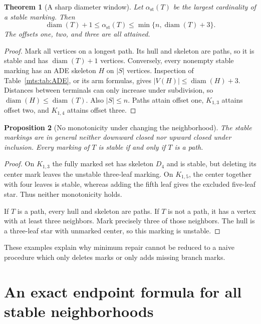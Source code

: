 \documentclass[11pt]{article}
\numberwithin{equation}{section}
\newtheorem{theorem}{Theorem}[section]
\newtheorem{proposition}[theorem]{Proposition}
\theoremstyle{definition}
\newcommand{\diam}{\operatorname{diam}}
\begin{document}
\begin{theorem}[A sharp diameter window]\label{mts:thm:diameter}
Let $\alpha_{\mathrm{st}}(T)$ be the largest cardinality of a stable marking.
Then
\begin{equation}
 \diam(T)+1\le\alpha_{\mathrm{st}}(T)
       \le\min\{n,\diam(T)+3\}.
 \label{mts:eq:diameter}
\end{equation}
The offsets one, two, and three are all attained.
\end{theorem}
\begin{proof}
Mark all vertices on a longest path. Its hull and skeleton are paths, so
it is stable and has $\diam(T)+1$ vertices. Conversely, every nonempty
stable marking has an ADE skeleton $H$ on $|S|$ vertices. Inspection of
Table~\ref{mts:tab:ADE}, or its arm formulas, gives
$|V(H)|\le\diam(H)+3$. Distances between terminals can only increase under
subdivision, so $\diam(H)\le\diam(T)$. Also $|S|\le n$.
Paths attain offset one, $K_{1,3}$ attains offset two, and $K_{1,4}$ attains
offset three.
\end{proof}

\begin{proposition}[No monotonicity under changing the neighborhood]\label{mts:prop:nonmonotone}
The stable markings are in general neither downward closed nor upward
closed under inclusion. Every marking of $T$ is stable if and only if $T$
is a path.
\end{proposition}
\begin{proof}
On $K_{1,3}$ the fully marked set has skeleton $D_4$ and is stable, but
deleting its center mark leaves the unstable three-leaf marking. On
$K_{1,5}$, the center together with four leaves is stable, whereas adding
the fifth leaf gives the excluded five-leaf star. Thus neither monotonicity
holds.

If $T$ is a path, every hull and skeleton are paths. If $T$ is not a path,
it has a vertex with at least three neighbors. Mark precisely three of
those neighbors. The hull is a three-leaf star with unmarked center, so
this marking is unstable.
\end{proof}

These examples explain why minimum repair cannot be reduced to a naive
procedure which only deletes marks or only adds missing branch marks.

\section{An exact endpoint formula for all stable neighborhoods}\label{mts:sec:enumeration}
\end{document}
